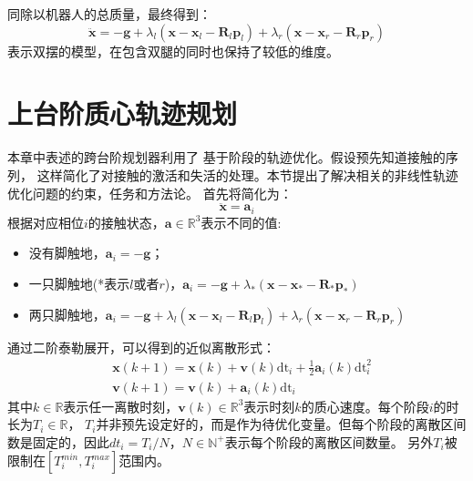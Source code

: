 同除以机器人的总质量，最终得到：
\begin{equation}
    \label{equ:newton_linear_2}
    \ddot{\boldsymbol{x}}= -\boldsymbol{g}+\lambda_l\left(\boldsymbol{x}-\boldsymbol{x}_l-\boldsymbol{R}_l \boldsymbol{p}_l\right) 
        +\lambda_r\left(\boldsymbol{x}-\boldsymbol{x}_r-\boldsymbol{R}_r \boldsymbol{p}_r\right)
\end{equation}
表示双摆的模型，在包含双腿的同时也保持了较低的维度。
\section{上台阶质心轨迹规划}
\label{sec:traj_plan}
本章中表述的跨台阶规划器利用了
基于阶段的轨迹优化。假设预先知道接触的序列，
这样简化了对接触的激活和失活的处理。本节提出了解决相关的非线性轨迹优化问题的约束，任务和方法论。
首先将简化为：
\begin{equation}
    \label{equ:acceleration}
    \ddot{\boldsymbol{x}} = \boldsymbol{a}_i
\end{equation}
根据对应相位$i$的接触状态，$\boldsymbol{a} \in \mathbb{R}^{3}$表示不同的值:
\begin{itemize}
    \item 没有脚触地，$\boldsymbol{a}_i = -\boldsymbol{g}$；
    \item 一只脚触地(*表示$l$或者$r$)，$\boldsymbol{a}_i=-\boldsymbol{g}+\lambda_*\left(\boldsymbol{x}-\boldsymbol{x}_*-\boldsymbol{R}_* \boldsymbol{p}_*\right)$
    \item 两只脚触地，$\boldsymbol{a}_i=-\boldsymbol{g}+\lambda_l\left(\boldsymbol{x}-\boldsymbol{x}_l-\boldsymbol{R}_l \boldsymbol{p}_l\right)
                    +\lambda_r\left(\boldsymbol{x}-\boldsymbol{x}_r-\boldsymbol{R}_r \boldsymbol{p}_r\right)$
\end{itemize}
通过二阶泰勒展开，可以得到的近似离散形式：
\begin{equation}
    \label{equ:approx_acc}
    \begin{aligned}
        & \boldsymbol{x}(k+1)=\boldsymbol{x}(k)+\boldsymbol{v}(k) \mathrm{dt}_i+\frac{1}{2} \boldsymbol{a}_i(k) \mathrm{dt}_i^2 \\
        & \boldsymbol{v}(k+1)=\boldsymbol{v}(k)+\boldsymbol{a}_i(k) \mathrm{dt}_i
        \end{aligned}
\end{equation}
其中$k \in \mathbb{R}$表示任一离散时刻，$\boldsymbol{v}(k) \in \mathbb{R}^{3}$表示时刻$k$的质心速度。每个阶段$i$的时长为$T_i \in \mathbb{R}$，
$T_i$并非预先设定好的，而是作为待优化变量。但每个阶段的离散区间数是固定的，因此$dt_i=T_i/N$，$N\in \mathbb{N}^+$表示每个阶段的离散区间数量。
另外$T_i$被限制在$[T_i^{min}, T_i^{max}]$范围内。
